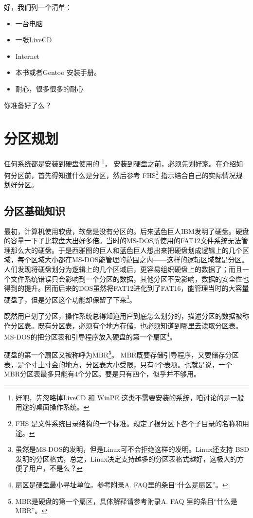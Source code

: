 \documentclass[amstex]{ctexbook}
\begin{document}
好，我们列一个清单：


\begin{itemize}
\item[ \checked] 一台电脑
\item[ \checked] 一张LiveCD
\item[ \checked] Internet
\item[ \checked] 本书或者Gentoo 安装手册。
\item[ \checked] 耐心，很多很多的耐心
\end{itemize}

你准备好了么？

\section{分区规划}
任何系统都是安装到硬盘使用的
\footnote{好吧，先忽略掉LiveCD 和  WinPE 这类不需要安装的系统，咱讨论的是一般用途的桌面操作系统。}，
安装到硬盘之前，必须先划好家。在介绍如何分区前，首先得知道什么是分区，然后参考
FHS\footnote{FHS 是文件系统目录结构的一个标准。规定了根分区下各个子目录的名称和用途。}
指示结合自己的实际情况规划好分区。

\subsection{分区基础知识}
最初，计算机使用软盘，软盘是没有分区的。后来蓝色巨人IBM发明了硬盘。硬盘的容量一下子比软盘大出好多倍。当时的MS-DOS所使用的FAT12文件系统无法管理那么大的硬盘。于是西雅图的巨人和蓝色巨人想出来把硬盘划成逻辑上的几个区域，每个区域大小都在MS-DOS能管理的范围之内——这样的逻辑区域就是分区。人们发现将硬盘划分为逻辑上的几个区域后，更容易组织硬盘上的数据了；而且一个文件系统错误只会影响到一个分区的数据，其他分区不受影响，数据的安全性也得到的提升。因而后来的DOS虽然将FAT12进化到了FAT16，能管理当时的大容量硬盘了，但是分区这个功能却保留了下来\footnote{虽然是MS-DOS的发明，但是Linux可不会拒绝这样的发明。Linux还支持 BSD 发明的分区格式，总之，Linux决定支持越多的分区表格式越好，这极大的方便了用户，不是么？}。

既然用户划了分区，操作系统总得知道用户到底怎么划分的，描述分区的数据被称作分区表。既有分区表，必须有个地方存储，也必须知道到哪里去读取分区表。MS-DOS的把分区表和引导程序放入硬盘的第一个扇区\footnote{扇区是硬盘最小寻址单位。参考附录A. FAQ里的条目“什么是扇区”。}。

硬盘的第一个扇区又被称呼为MBR\footnote{MBR是硬盘的第一个扇区，具体解释请参考附录A. FAQ 里的条目“什么是 MBR”。}。
MBR既要存储引导程序，又要储存分区表，是个寸土寸金的地方，分区表大小受限，只有4个表项。也就是说，一个 MBR分区表最多只能有4个分区。要是只有四个，似乎并不够用。
\end{document}
